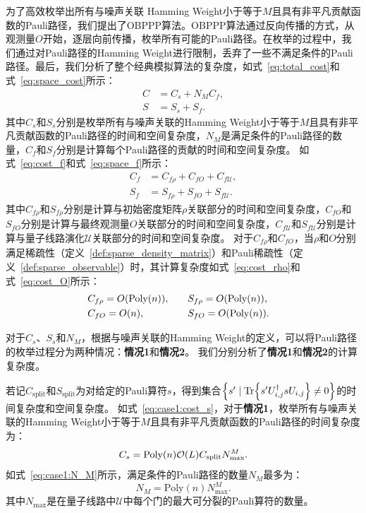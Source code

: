 为了高效枚举出所有与噪声关联 Hamming Weight小于等于$M$且具有非平凡贡献函数的Pauli路径，我们提出了OBPPP算法。OBPPP算法通过反向传播的方式，从观测量$O$开始，逐层向前传播，枚举所有可能的Pauli路径。在枚举的过程中，我们通过对Pauli路径的Hamming Weight进行限制，丢弃了一些不满足条件的Pauli路径。最后，我们分析了整个经典模拟算法的复杂度，如式~\eqref{eq:total_cost}和式~\eqref{eq:space_cost}所示：
\begin{equation*}
    \begin{aligned}
        C &= C_s+N_MC_f, \\
        S &= S_s+S_f.
    \end{aligned}
\end{equation*}
其中$C_s$和$S_s$分别是枚举所有与噪声关联的Hamming Weight小于等于$M$且具有非平凡贡献函数的Pauli路径的时间和空间复杂度，$N_M$是满足条件的Pauli路径的数量，$C_f$和$S_f$分别是计算每个Pauli路径的贡献的时间和空间复杂度。
如式~\eqref{eq:cost_f}和式~\eqref{eq:space_f}所示：
\begin{equation*}
    \begin{aligned}
        C_f &= C_{f\rho}+C_{fO}+C_{f\mathcal{U}},\\
        S_f &= S_{f\rho}+S_{fO}+S_{f\mathcal{U}}.
    \end{aligned}
\end{equation*}
其中$C_{f\rho}$和$S_{f\rho}$分别是计算与初始密度矩阵$\rho$关联部分的时间和空间复杂度，$C_{fO}$和$S_{fO}$分别是计算与最终观测量$O$关联部分的时间和空间复杂度，$C_{f\mathcal{U}}$和$S_{f\mathcal{U}}$分别是计算与量子线路演化$\mathcal{U}$关联部分的时间和空间复杂度。
对于$C_{f\rho}$和$C_{fO}$，当$\rho$和$O$分别满足稀疏性（定义~\ref{def:sparse_density_matrix}）和Pauli稀疏性（定义~\ref{def:sparse_observable}）时，其计算复杂度如式~\eqref{eq:cost_rho}和式~\eqref{eq:cost_O}所示：
\begin{equation*}
    \begin{aligned}
        &C_{f\rho}=O(\text{Poly}(n)),&\quad   &S_{f\rho}=O(\text{Poly}(n)),& \\
        &C_{fO}=O(n),&\quad  &S_{fO}=O(\text{Poly}(n)).&
    \end{aligned}
\end{equation*}


对于$C_s$、$S_s$和$N_M$，根据与噪声关联的Hamming Weight的定义，可以将Pauli路径的枚举过程分为两种情况：\textbf{情况1}和\textbf{情况2}。
我们分别分析了\textbf{情况1}和\textbf{情况2}的计算复杂度。

若记$C_{\text{split}}$和$S_{\text{split}}$为对给定的Pauli算符$s$，得到集合$\left\{ s'\mid \Tr{s' U^\dagger_{i,j}s U_{i,j}}\neq 0 \right\}$的时间复杂度和空间复杂度。
如式~\eqref{eq:case1:cost_s}，对于\textbf{情况1}，枚举所有与噪声关联的Hamming Weight小于等于$M$且具有非平凡贡献函数的Pauli路径的时间复杂度为：
\begin{equation*}
        C_s=\mathrm{Poly}(n) \order{L} C_{\text{split}} N_{\text{max}}^{M}.
\end{equation*}
如式~\eqref{eq:case1:N_M}所示，满足条件的Pauli路径的数量$N_M$最多为：
\begin{equation*}
    N_M=\mathrm{Poly}(n) N_{\text{max}}^{M}.
\end{equation*}
其中$N_{\text{max}}$是在量子线路中$\mathcal{U}$中每个门的最大可分裂的Pauli算符的数量。

